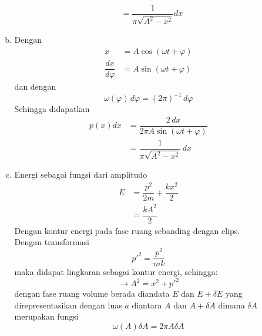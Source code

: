 \begin{enumerate}
\begin{enumerate}[(a)]
\begin{equation*}
\begin{split}
                &=\dfrac{1}{\pi\sqrt{A^2-x^2}}dx
            \end{split}
        \end{equation*}
        \item Dengan
        \begin{equation*}
            \begin{split}
                x&=A\cos(\omega t+\varphi)\\
                \dfrac{dx}{d\varphi}&=A\sin(\omega t+\varphi)
            \end{split}
        \end{equation*}
        dan dengan
        \begin{equation*}
            \omega(\varphi)\,d\varphi=(2\pi)^{-1}\,d\varphi
        \end{equation*}
        Sehingga didapatkan
        \begin{equation*}
            \begin{split}
                p(x)dx&=\dfrac{2\,dx}{2\pi A\sin(\omega t+\varphi)}\\
                &=\dfrac{1}{\pi\sqrt{A^2-x^2}}\,dx
            \end{split}
        \end{equation*}
        \item Energi sebagai fungsi dari amplitudo
        \begin{equation*}
            \begin{split}
                E&=\dfrac{p^2}{2m}+\dfrac{kx^2}{2}\\
                &=\dfrac{kA^2}{2}
            \end{split}
        \end{equation*}
        Dengan kontur energi pada fase ruang sebanding dengan elips.\\
        Dengan transformasi
        \begin{equation*}
            p\prime^2=\dfrac{p^2}{mk}
        \end{equation*}
        maka didapat lingkaran sebagai kontur energi, sehingga:
        \begin{equation*}
            \rightarrow A^2=x^2+p\prime^2 
        \end{equation*}
        dengan fase ruang volume berada diandata $E$ dan $E+\delta E$ yang direpresentasikan dengan luas $a$ diantara $A$ dan $A+\delta A$ dimana $\delta A$ merupakan fungsi
        \begin{equation*}
            \omega(A)\delta A=2\pi A\delta A

\end{equation*}
\end{enumerate}
\end{enumerate}
